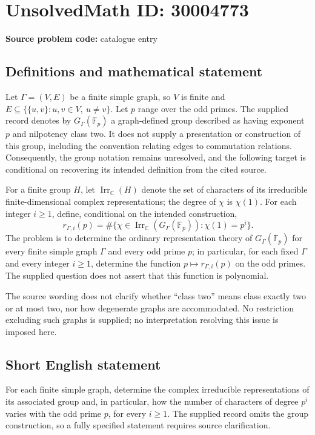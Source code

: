 \documentclass[11pt]{article}
\newcommand{\C}{\mathbb{C}}
\newcommand{\F}{\mathbb{F}}
\begin{document}
\section*{UnsolvedMath ID: 30004773}
\textbf{Source problem code:} catalogue entry
\subsection{Definitions and mathematical statement}
Let \(\Gamma=(V,E)\) be a finite simple graph, so \(V\) is finite and \(E\subseteq\{\{u,v\}:u,v\in V,\ u\ne v\}\). Let \(p\) range over the odd primes. The supplied record denotes by \(G_\Gamma(\F_p)\) a graph-defined group described as having exponent \(p\) and nilpotency class two. It does not supply a presentation or construction of this group, including the convention relating edges to commutation relations. Consequently, the group notation remains unresolved, and the following target is conditional on recovering its intended definition from the cited source.

For a finite group \(H\), let \(\operatorname{Irr}_{\C}(H)\) denote the set of characters of its irreducible finite-dimensional complex representations; the degree of \(\chi\) is \(\chi(1)\). For each integer \(i\geq1\), define, conditional on the intended construction,
\[
 r_{\Gamma,i}(p)=\#\bigl\{\chi\in\operatorname{Irr}_{\C}(G_\Gamma(\F_p)):\chi(1)=p^i\bigr\}.
\]
The problem is to determine the ordinary representation theory of \(G_\Gamma(\F_p)\) for every finite simple graph \(\Gamma\) and every odd prime \(p\); in particular, for each fixed \(\Gamma\) and every integer \(i\geq1\), determine the function \(p\mapsto r_{\Gamma,i}(p)\) on the odd primes. The supplied question does not assert that this function is polynomial.

The source wording does not clarify whether ``class two'' means class exactly two or at most two, nor how degenerate graphs are accommodated. No restriction excluding such graphs is supplied; no interpretation resolving this issue is imposed here.
\subsection{Short English statement}
For each finite simple graph, determine the complex irreducible representations of its associated group and, in particular, how the number of characters of degree \(p^i\) varies with the odd prime \(p\), for every \(i\geq1\). The supplied record omits the group construction, so a fully specified statement requires source clarification.
\end{document}
